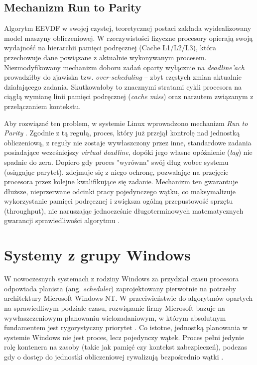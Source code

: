 \subsection{Mechanizm Run to Parity}
Algorytm EEVDF w swojej czystej, teoretycznej postaci zakłada wyidealizowany model maszyny obliczeniowej. W rzeczywistości fizyczne procesory opierają swoją wydajność na hierarchii pamięci podręcznej (Cache L1/L2/L3), która przechowuje dane powiązane z aktualnie wykonywanym procesem. Niezmodyfikowany mechanizm doboru zadań oparty wyłącznie na \textit{deadline'ach} prowadziłby do zjawiska tzw. \textit{over-scheduling} – zbyt częstych zmian aktualnie działającego zadania. Skutkowałoby to znacznymi stratami cykli procesora na ciągłą wymianę linii pamięci podręcznej (\textit{cache miss}) oraz narzutem związanym z przełączaniem kontekstu.

Aby rozwiązać ten problem, w systemie Linux wprowadzono mechanizm \textit{Run to Parity} \cite{26}. Zgodnie z tą regułą, proces, który już przejął kontrolę nad jednostką obliczeniową, z reguły nie zostaje wywłaszczony przez inne, standardowe zadania posiadające wcześniejszy \textit{virtual deadline}, dopóki jego własne opóźnienie (\textit{lag}) nie spadnie do zera. Dopiero gdy proces "wyrówna" swój dług wobec systemu (osiągając parytet), zdejmuje się z niego ochronę, pozwalając na przejęcie procesora przez kolejne kwalifikujące się zadanie. Mechanizm ten gwarantuje dłuższe, nieprzerwane odcinki pracy pojedynczego wątku, co maksymalizuje wykorzystanie pamięci podręcznej i zwiększa ogólną przepustowość sprzętu (throughput), nie naruszając jednocześnie długoterminowych matematycznych gwarancji sprawiedliwości algorytmu \cite{38}.






\section{Systemy z grupy Windows}
W nowoczesnych systemach z rodziny Windows za przydział czasu procesora odpowiada planista (ang. \textit{scheduler}) zaprojektowany pierwotnie na potrzeby architektury Microsoft Windows NT. W przeciwieństwie do algorytmów opartych na sprawiedliwym podziale czasu, rozwiązanie firmy Microsoft bazuje na wywłaszczeniowym planowaniu wielozadaniowym, w którym absolutnym fundamentem jest rygorystyczny priorytet \cite{loyolaProcThreadScheduling}. Co istotne, jednostką planowania w systemie Windows nie jest proces, lecz pojedynczy wątek. Proces pełni jedynie rolę kontenera na zasoby (takie jak pamięć czy kontekst zabezpieczeń), podczas gdy o dostęp do jednostki obliczeniowej rywalizują bezpośrednio wątki \cite{msLearnProcessesThreads}.

